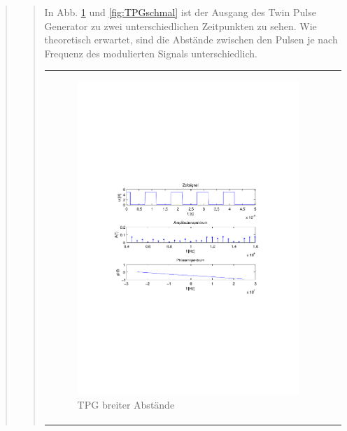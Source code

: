 \begin{quote}
\begin{quote}
        In Abb. \ref{fig:TPGbreit} und \ref{fig:TPGschmal} ist der Ausgang des
        Twin Pulse Generator zu zwei unterschiedlichen Zeitpunkten zu sehen. Wie
        theoretisch erwartet, sind die Abstände zwischen den Pulsen je nach
        Frequenz des modulierten Signals unterschiedlich. 
        
         \begin{center}
            \begin{tabular}{ll}
            
            \hspace{-5cm}
                \begin{minipage}{0.67\textwidth}
                    \begin{figure}[H]
                        \label{fig:TPGbreit}
                        \includegraphics[scale=0.7, trim = 35mm 100mm 35mm 95mm, clip]{Bilder/f1TwPu_breit}
                        \caption{TPG breiter Abstände}
                    \end{figure}
                \end{minipage}
                

\end{tabular}
\end{center}
\end{quote}
\end{quote}
